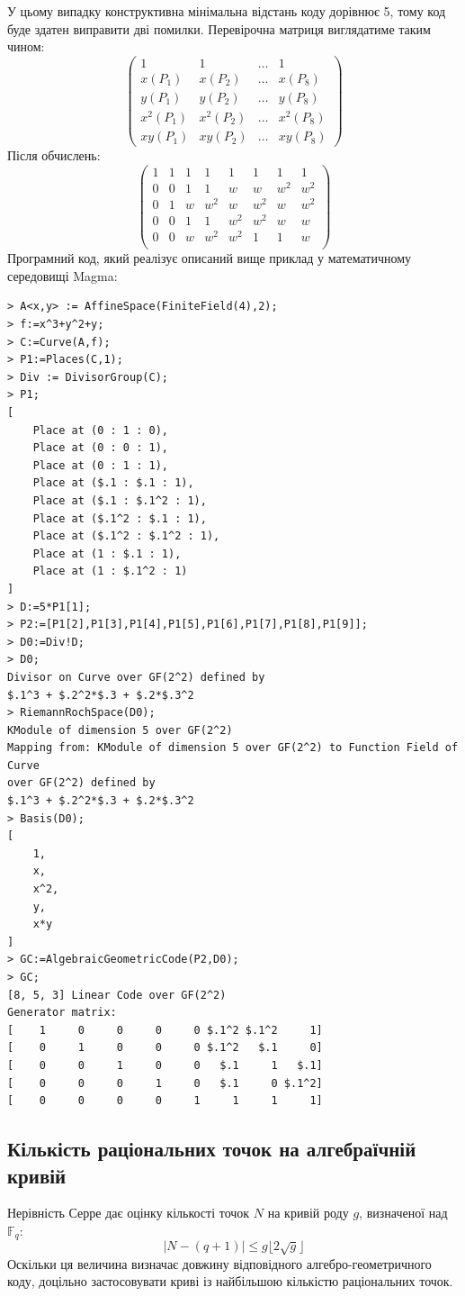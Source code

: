 \documentclass[a4paper,12pt,oneside]{article}
\begin{document}
У цьому випадку конструктивна мінімальна відстань коду дорівнює 5, тому код буде здатен виправити дві помилки.
Перевірочна матриця виглядатиме таким чином:
$$
\begin{pmatrix}
1 & 1 & \dots & 1 \\
x(P_1) & x(P_2) & \dots & x(P_8) \\
y(P_1) & y(P_2) & \dots & y(P_8) \\
x^2(P_1) & x^2(P_2) & \dots & x^2(P_8) \\
xy(P_1) & xy(P_2) & \dots & xy(P_8)
\end{pmatrix}
$$
Після обчислень:
$$
\begin{pmatrix}
1 & 1 & 1 & 1 & 1 & 1 & 1 & 1 \\
0 & 0 & 1 & 1 & w & w & w^2 & w^2 \\
0 & 1 & w & w^2 & w & w^2 & w & w^2 \\
0 & 0 & 1 & 1 & w^2 & w^2 & w & w \\
0 & 0 & w & w^2 & w^2 & 1 & 1 & w \\
\end{pmatrix}
$$
Програмний код, який реалізує описаний вище приклад у математичному середовищі Magma:
\begin{verbatim}
> A<x,y> := AffineSpace(FiniteField(4),2);
> f:=x^3+y^2+y;
> C:=Curve(A,f);
> P1:=Places(C,1);
> Div := DivisorGroup(C);
> P1;
[
    Place at (0 : 1 : 0),
    Place at (0 : 0 : 1),
    Place at (0 : 1 : 1),
    Place at ($.1 : $.1 : 1),
    Place at ($.1 : $.1^2 : 1),
    Place at ($.1^2 : $.1 : 1),
    Place at ($.1^2 : $.1^2 : 1),
    Place at (1 : $.1 : 1),
    Place at (1 : $.1^2 : 1)
]
> D:=5*P1[1];
> P2:=[P1[2],P1[3],P1[4],P1[5],P1[6],P1[7],P1[8],P1[9]];
> D0:=Div!D;
> D0;
Divisor on Curve over GF(2^2) defined by
$.1^3 + $.2^2*$.3 + $.2*$.3^2
> RiemannRochSpace(D0);
KModule of dimension 5 over GF(2^2)
Mapping from: KModule of dimension 5 over GF(2^2) to Function Field of Curve 
over GF(2^2) defined by
$.1^3 + $.2^2*$.3 + $.2*$.3^2
> Basis(D0);
[
    1,
    x,
    x^2,
    y,
    x*y
]
> GC:=AlgebraicGeometricCode(P2,D0);
> GC;
[8, 5, 3] Linear Code over GF(2^2)
Generator matrix:
[    1     0     0     0     0 $.1^2 $.1^2     1]
[    0     1     0     0     0 $.1^2   $.1     0]
[    0     0     1     0     0   $.1     1   $.1]
[    0     0     0     1     0   $.1     0 $.1^2]
[    0     0     0     0     1     1     1     1]
\end{verbatim}

\subsection{Кількість раціональних точок на алгебраїчній кривій}
Нерівність Серре дає оцінку кількості точок $N$ на кривій роду $g$, визначеної над $\mathbb{F}_q$:
$$|N-(q+1)| \le g \lfloor 2 \sqrt{g} \rfloor$$
Оскільки ця величина визначає довжину відповідного алгебро-геометричного коду, доцільно застосовувати криві із найбільшою кількістю 
раціональних точок.
\end{document}
